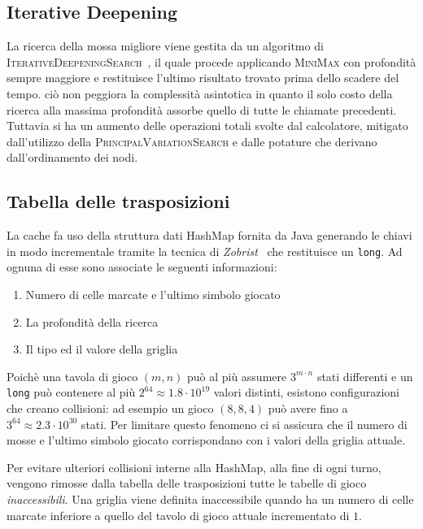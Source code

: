 \documentclass{article}
\begin{document}
\subsection{Iterative Deepening}

La ricerca della mossa migliore viene gestita da un algoritmo di
\textsc{IterativeDeepeningSearch}~\cite{id}, il quale procede applicando \textsc{MiniMax} 
con profondit\`a sempre maggiore e restituisce l'ultimo risultato trovato prima dello
scadere del tempo. \label{cost:id} ci\`o non peggiora la complessit\`a asintotica in quanto il
solo costo della ricerca alla massima profondit\`a assorbe quello di tutte
le chiamate precedenti. Tuttavia si ha un aumento delle operazioni totali svolte
dal calcolatore, mitigato dall'utilizzo della \textsc{PrincipalVariationSearch} 
e dalle potature che derivano dall'ordinamento dei nodi.

\subsection{Tabella delle trasposizioni}

La cache fa uso della struttura dati HashMap fornita da Java generando le chiavi 
in modo incrementale tramite la tecnica di \emph{Zobrist}~\cite{zobrist} che restituisce un \verb!long!. 
Ad ognuna di esse sono associate le seguenti informazioni:
\begin{enumerate}
  \item Numero di celle marcate e l'ultimo simbolo giocato
  \item La profondit\`a della ricerca
  \item Il tipo ed il valore della griglia
\end{enumerate}
Poich\`e una tavola di gioco $(m,n)$ pu\`o al pi\`u assumere $3^{m \cdot n}$ stati differenti e
un \verb!long! pu\`o contenere al pi\`u $2^{64} \approx 1.8 \cdot 10^{19}$ valori distinti,
esistono configurazioni che creano collisioni: ad esempio un gioco $(8, 8, 4)$
pu\`o avere fino a $3^{64} \approx 2.3 \cdot 10^{30}$ stati. Per limitare questo
fenomeno ci si assicura che il numero di mosse e l'ultimo simbolo giocato
corrispondano con i valori della griglia attuale.

Per evitare ulteriori collisioni interne alla HashMap, alla fine di ogni turno,
vengono rimosse dalla tabella delle trasposizioni tutte le tabelle di gioco %
\emph{inaccessibili}. Una griglia viene definita inaccessibile quando ha un numero di
celle marcate inferiore a quello del tavolo di gioco attuale incrementato di $1$.
\end{document}
